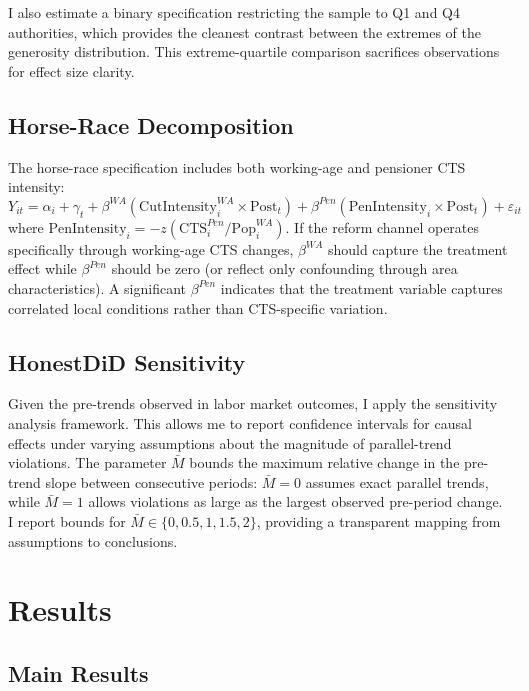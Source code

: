 \documentclass[12pt]{article}
\begin{document}
I also estimate a binary specification restricting the sample to Q1 and Q4 authorities, which provides the cleanest contrast between the extremes of the generosity distribution. This extreme-quartile comparison sacrifices observations for effect size clarity.

\subsection{Horse-Race Decomposition}

The horse-race specification includes both working-age and pensioner CTS intensity:
\begin{equation}\label{eq:horse}
Y_{it} = \alpha_i + \gamma_t + \beta^{WA} (\text{CutIntensity}_i^{WA} \times \text{Post}_t) + \beta^{Pen} (\text{PenIntensity}_i \times \text{Post}_t) + \varepsilon_{it}
\end{equation}
where $\text{PenIntensity}_i = -z(\text{CTS}_{i}^{Pen}/\text{Pop}_{i}^{WA})$. If the reform channel operates specifically through working-age CTS changes, $\beta^{WA}$ should capture the treatment effect while $\beta^{Pen}$ should be zero (or reflect only confounding through area characteristics). A significant $\beta^{Pen}$ indicates that the treatment variable captures correlated local conditions rather than CTS-specific variation.

\subsection{HonestDiD Sensitivity}

Given the pre-trends observed in labor market outcomes, I apply the \citet{rambachan2023} sensitivity analysis framework. This allows me to report confidence intervals for causal effects under varying assumptions about the magnitude of parallel-trend violations. The parameter $\bar{M}$ bounds the maximum relative change in the pre-trend slope between consecutive periods: $\bar{M} = 0$ assumes exact parallel trends, while $\bar{M} = 1$ allows violations as large as the largest observed pre-period change. I report bounds for $\bar{M} \in \{0, 0.5, 1, 1.5, 2\}$, providing a transparent mapping from assumptions to conclusions.

\section{Results}\label{sec:results}

\subsection{Main Results}
\end{document}
